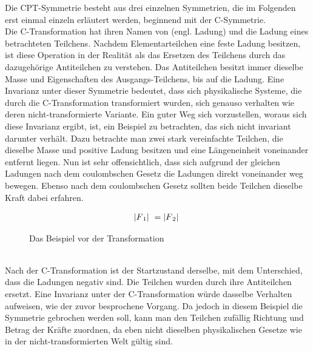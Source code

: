 \documentclass[12pt,a4paper]{scrartcl}
\numberwithin{equation}{section}
\begin{document}
Die CPT-Symmetrie besteht aus drei einzelnen Symmetrien, die im Folgenden erst einmal einzeln erläutert werden, beginnend mit der C-Symmetrie. \\
Die C-Transformation hat ihren Namen von \grqq{} (engl. Ladung) und \grqq{} die Ladung eines betrachteten Teilchens. Nachdem Elementarteilchen eine feste Ladung besitzen, ist diese Operation in der Realität als das Ersetzen des Teilchens durch das dazugehörige Antiteilchen zu verstehen. Das Antiteilchen besitzt immer dieselbe Masse und Eigenschaften des Ausgangs-Teilchens, bis auf die \grqq{} Ladung. Eine Invarianz unter dieser Symmetrie bedeutet, dass sich physikalische Systeme, die durch die C-Transformation transformiert wurden, sich genauso verhalten wie deren nicht-transformierte Variante. Ein guter Weg sich vorzustellen, woraus sich diese Invarianz ergibt, ist, ein Beispiel zu betrachten, das sich nicht invariant darunter verhält. Dazu betrachte man zwei stark vereinfachte Teilchen, die dieselbe Masse und positive Ladung besitzen und eine Längeneinheit voneinander entfernt liegen. Nun ist sehr offensichtlich, dass sich aufgrund der gleichen Ladungen nach dem coulombschen Gesetz die Ladungen direkt voneinander weg bewegen. Ebenso nach dem coulombschen Gesetz sollten beide Teilchen dieselbe Kraft dabei erfahren.\cite{shnirman15}
\begin{figure} [!ht]
\centering
{}
\begin{align}
    \lvert F\textsubscript{1}\rvert\ = \lvert F\textsubscript{2}\rvert\
\end{align}
\caption{Das Beispiel vor der Transformation}
\end{figure}
\\
Nach der C-Transformation ist der Startzustand derselbe, mit dem Unterschied, dass die Ladungen negativ sind. Die Teilchen wurden durch ihre Antiteilchen ersetzt. Eine Invarianz unter der C-Transformation würde dasselbe Verhalten aufweisen, wie der zuvor besprochene Vorgang. Da jedoch in diesem Beispiel die Symmetrie gebrochen werden soll, kann man den Teilchen zufällig Richtung und Betrag der Kräfte zuordnen, da eben nicht dieselben physikalischen Gesetze wie in der nicht-transformierten Welt gültig sind.
\end{document}
